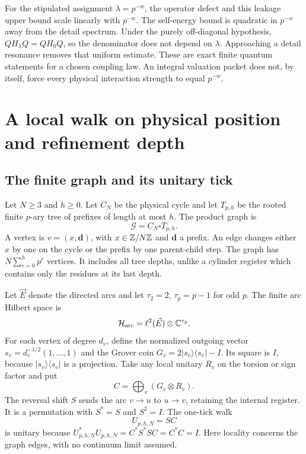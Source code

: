 For the stipulated assignment $\lambda=p^{-w}$, the operator defect and
this leakage upper bound scale linearly with $p^{-w}$. The self-energy
bound is quadratic in $p^{-w}$ away from the detail spectrum. Under the
purely off-diagonal hypothesis, $QH_\lambda Q=QH_0Q$, so the denominator
does not depend on $\lambda$. Approaching a detail resonance removes
that uniform estimate. These are exact finite quantum statements for a
chosen coupling law. An integral valuation packet does not, by itself,
force every physical interaction strength to equal $p^{-w}$.


\section{A local walk on physical position and refinement depth}
\label{a-limit-product-walk}

\subsection{The finite graph and its unitary tick}

Let $N\geq3$ and $h\geq0$. Let $C_N$ be the physical cycle and let
$T_{p,h}$ be the rooted finite $p$-ary tree of prefixes of length at most
$h$. The product graph is
\[
 \mathcal G=C_N\square T_{p,h}.
\]
A vertex is $v=(x,\mathbf d)$, with $x\in\mathbb Z/N\mathbb Z$ and $\mathbf d$ a
prefix. An edge changes either $x$ by one on the cycle or the prefix by
one parent-child step. The graph has
$N\sum_{r=0}^h p^r$ vertices. It includes all tree depths, unlike a
cylinder register which contains only the residues at its last depth.

Let $\vec E$ denote the directed arcs and let $\tau_2=2$,
$\tau_p=p-1$ for odd $p$. The finite arc Hilbert space is
\[
 \mathcal H_{\mathrm{arc}}=\ell^2(\vec E)\otimes\mathbb C^{\tau_p}.
\]
For each vertex of degree $d_v$, define the normalized outgoing vector
$s_v=d_v^{-1/2}(1,\ldots,1)$ and the Grover coin
$G_v=2|s_v\rangle\langle s_v|-I$.
Its square is $I$, because $|s_v\rangle\langle s_v|$ is a projection.
Take any local unitary $R_v$ on the torsion or sign factor and put
\[
 C=\bigoplus_v(G_v\otimes R_v).
\]
The reversal shift $S$ sends the arc $v\to u$ to $u\to v$, retaining
the internal register. It is a permutation with $S^*=S$ and $S^2=I$.
The one-tick walk
\begin{equation}
 U_{p,h,N}=SC
 \label{a-limit-walk-unitary}
\end{equation}
is unitary because $U_{p,h,N}^*U_{p,h,N}=C^*S^*SC=C^*C=I$.
Here locality concerns the graph edges, with no continuum limit assumed.

